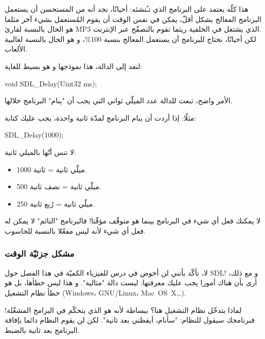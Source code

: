 \begin{information}
هذا كلّه يعتمد على البرنامج الذي تـُنشئه: أحيانًا، نجد أنه من المستحسن أن يستعمل البرنامج المعالج بشكل أقلّ، يمكن في نفس الوقت أن يقوم المُستعمل بشيء آخر مثلما هو الحال بالنسبة لقارئ
\textenglish{MP3}
الذي يشتغل في الخلفية ريثما تقوم بالتصفّح عبر الإنترنت.\\
لكن أحيانًا، نحتاج للبرنامج أن يستعمل المعالج بنسبة 100\%، و هو الحال بالنسبة لغالبية الألعاب.
\end{information}

لنعد إلى الدالة، هذا نموذجها و هو بسيط للغاية:

\begin{Csource}
void SDL_Delay(Uint32 ms);
\end{Csource}

الأمر واضح، تبعث للدالة عدد الميلّي ثواني التي يجب أن "ينام" البرنامج خلالها. 

مثلًا: إذا أردت أن ينام البرنامج لمدّة ثانية واحدة، يجب عليك كتابة:

\begin{Csource}
SDL_Delay(1000);
\end{Csource}

 
لا تنس أنّها بالميلي ثانية:

\begin{itemize}
	\item 1000 ميلّي ثانية = ثانية.
	\item 500 ميلّي ثانية = نصف ثانية.
	\item 250 ميلّي ثانية = رُبع ثانية.
\end{itemize}

\begin{warning}
لا يمكنك فعل أي شيء في البرنامج بينما هو متوقّف مؤقّتا! فالبرنامج "النائم" لا يمكن له فعل أي شيء لأنه ليس مفعّلا بالنسبة للحاسوب.
\end{warning}

\subsubsection{مشكل جزئيّة الوقت}

لا، تأكّد بأنني لن أخوض في درس للفيزياء الكميّة في هذا الفصل حول \textenglish{SDL}!
و مع ذلك، أرى بأن هناك أمورا يجب عليك معرفتها: 
ليست دالة "مثالية". و هذا ليس خطأها، بل هو خطأ نظام التشغيل 
(\textenglish{Windows}، \mbox{\textenglish{GNU/Linux}}، \mbox{\textenglish{Mac OS X}}\dots).

لماذا يتدخّل نظام التشغيل هنا؟ ببساطة لأنه هو الذي يتحكّم في البرامج المشغّلة! فبرنامجك سيقول للنظام: "سأنام، أيقظني بعد ثانية". لكن لن يقوم النظام دائما بإفاقة البرنامج بعد ثانية بالضبط.


